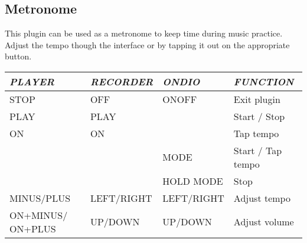 \subsection{Metronome}
This plugin can be used as a metronome to keep time during music
practice.  Adjust the tempo though the interface or by tapping it out
on the appropriate button.

\begin{tabular}[c]{|p{2.587cm}|p{2.55cm}|p{2.62cm}|p{4.952cm}|}
\hline
{\centering\bfseries\itshape
PLAYER 
\par}
&
{\centering\bfseries\itshape
RECORDER 
\par}
&
{\centering\bfseries\itshape
ONDIO 
\par}
&
{\centering\bfseries\itshape
FUNCTION 
\par}
\\\hline
{\centering
STOP 
\par}
&
{\centering
OFF 
\par}
&
{\centering
ONOFF 
\par}
&
Exit plugin 
\\\hline
{\centering
PLAY 
\par}
&
{\centering
PLAY 
\par}
&
{\centering
~ 
\par}
&
Start / Stop 
\\\hline
{\centering
ON 
\par}
&
{\centering
ON 
\par}
&
{\centering
~ 
\par}
&
Tap tempo 
\\\hline
{\centering
~ 
\par}
&
{\centering
~ 
\par}
&
{\centering
MODE 
\par}
&
Start / Tap tempo
\\\hline
{\centering
~ 
\par}
&
{\centering
~ 
\par}
&
{\centering
HOLD MODE 
\par}
&
Stop 
\\\hline
{\centering
MINUS/PLUS
\par}
&
{\centering
LEFT/RIGHT 
\par}
&
{\centering
LEFT/RIGHT 
\par}
&
Adjust tempo 
\\\hline
{\centering
ON+MINUS/\newline
ON+PLUS 
\par}
&
{\centering
UP/DOWN 
\par}
&
{\centering
UP/DOWN 
\par}
&
Adjust volume
\\\hline
\end{tabular}


